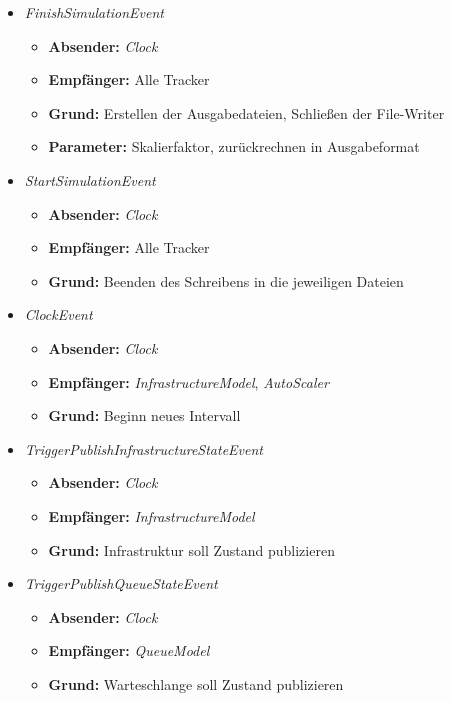 \begin{itemize}


	\item \textit{FinishSimulationEvent} 
	\begin{itemize}
         \item \textbf{Absender:} \textit{Clock}
         \item \textbf{Empfänger:} Alle Tracker
         \item \textbf{Grund:} Erstellen der Ausgabedateien, Schließen der File-Writer
         \item \textbf{Parameter:} Skalierfaktor, zurückrechnen in Ausgabeformat
 	\end{itemize} 
     
    	\item \textit{StartSimulationEvent} 
    \begin{itemize}
    	\item \textbf{Absender:} \textit{Clock}
    	\item \textbf{Empfänger:} Alle Tracker
    	\item \textbf{Grund:} Beenden des Schreibens in die jeweiligen Dateien
    \end{itemize} 

	\item \textit{ClockEvent} 
\begin{itemize}
	\item \textbf{Absender:} \textit{Clock}
	\item \textbf{Empfänger:} \textit{InfrastructureModel}, \textit{AutoScaler}
	\item \textbf{Grund:} Beginn neues Intervall
\end{itemize} 

	\item \textit{TriggerPublishInfrastructureStateEvent} 
\begin{itemize}
	\item \textbf{Absender:} \textit{Clock}
	\item \textbf{Empfänger:}  \textit{InfrastructureModel}
	\item \textbf{Grund:} Infrastruktur soll Zustand publizieren
\end{itemize} 

	\item \textit{TriggerPublishQueueStateEvent} 
\begin{itemize}
	\item \textbf{Absender:} \textit{Clock}
	\item \textbf{Empfänger:} \textit{QueueModel}
	\item \textbf{Grund:} Warteschlange soll Zustand publizieren
\end{itemize} 


\end{itemize}
